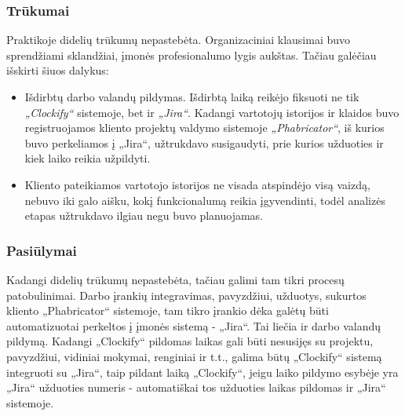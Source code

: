 \subsubsection{Trūkumai}
Praktikoje didelių trūkumų nepastebėta. Organizaciniai klausimai buvo sprendžiami sklandžiai, įmonės profesionalumo lygis aukštas. Tačiau galėčiau išskirti šiuos dalykus:

\begin{itemize}
    \item Išdirbtų darbo valandų pildymas. Išdirbtą laiką reikėjo fiksuoti ne tik \textit{„Clockify“} sistemoje, bet ir \textit{„Jira“}. Kadangi vartotojų istorijos ir klaidos buvo registruojamos
    kliento projektų valdymo sistemoje \textit{„Phabricator“}, iš kurios buvo perkeliamos į „Jira“, užtrukdavo susigaudyti, prie kurios užduoties ir kiek laiko reikia užpildyti.
    \item Kliento pateikiamos vartotojo istorijos ne visada atspindėjo visą vaizdą, nebuvo iki galo aišku, kokį funkcionalumą reikia įgyvendinti, todėl analizės etapas užtrukdavo ilgiau
    negu buvo planuojamas.
\end{itemize}


\subsubsection{Pasiūlymai}
Kadangi didelių trūkumų nepastebėta, tačiau galimi tam tikri procesų patobulinimai. Darbo įrankių integravimas, pavyzdžiui, užduotys, sukurtos kliento „Phabricator“ sistemoje,
tam tikro įrankio dėka galėtų būti automatizuotai perkeltos į įmonės sistemą - „Jira“. Tai liečia ir darbo valandų pildymą. Kadangi „Clockify“ pildomas laikas
gali būti nesusijęs su projektu, pavyzdžiui, vidiniai mokymai, renginiai ir t.t., galima būtų „Clockify“ sistemą integruoti su „Jira“, taip pildant laiką „Clockify“,
jeigu laiko pildymo esybėje yra „Jira“ užduoties numeris - automatiškai tos užduoties laikas pildomas ir „Jira“ sistemoje.